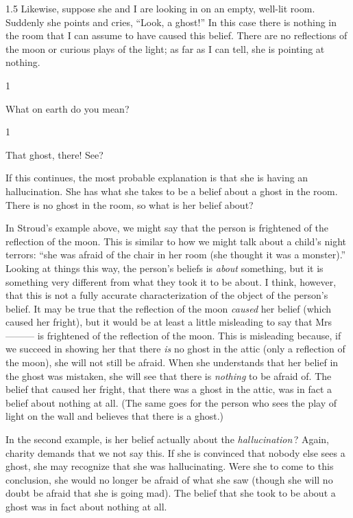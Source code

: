 \documentclass[11pt]{article}
\newcommand{\stage}[3]%
{%
	\begin{spacing}{1}%
	\vspace{0pt}
		\begin{description}[style=nextline, parsep=0pt, leftmargin=15mm, itemindent=-10mm, font=\mdseries]
			\item[\textsc{#1} \emph{#2}] #3
		\end{description}%
	\end{spacing}%
}
\begin{document}
\begin{spacing}{1.5}
Likewise, suppose she and I are looking in on an empty, well-lit room. Suddenly she points and cries, ``Look, a ghost!'' In this case there is nothing in the room that I can assume to have caused this belief. There are no reflections of the moon or curious plays of the light; as far as I can tell, she is pointing at nothing.

\stage{Me}{}{What on earth do you mean?}

\stage{Her}{(pointing)}{That ghost, there! See?}

If this continues, the most probable explanation is that she is having an hallucination. She has what she takes to be a belief about a ghost in the room. There is no ghost in the room, so what is her belief about? 

In Stroud's example above, we might say that the person is frightened of the reflection of the moon. This is similar to how we might talk about a child's night terrors: ``she was afraid of the chair in her room (she thought it was a monster).'' Looking at things this way, the person's beliefs is {\em about} something, but it is something very different from what they took it to be about. I think, however, that this is not a fully accurate characterization of the object of the person's belief. It may be true that the reflection of the moon {\em caused} her belief (which caused her fright), but it would be at least a little misleading to say that Mrs --------- is frightened of the reflection of the moon. This is misleading because, if we succeed in showing her that there {\em is} no ghost in the attic (only a reflection of the moon), she will not still be afraid. When she understands that her belief in the ghost was mistaken, she will see that there is {\em nothing} to be afraid of. The belief that caused her fright, that there was a ghost in the attic, was in fact a belief about nothing at all. (The same goes for the person who sees the play of light on the wall and believes that there is a ghost.)

In the second example, is her belief actually about the {\em hallucination}\,? Again, charity demands that we not say this. If she is convinced that nobody else sees a ghost, she may recognize that she was hallucinating. Were she to come to this conclusion, she would no longer be afraid of what she saw (though she will no doubt be afraid that she is going mad). The belief that she took to be about a ghost was in fact about nothing at all.


\end{spacing}
\end{document}
